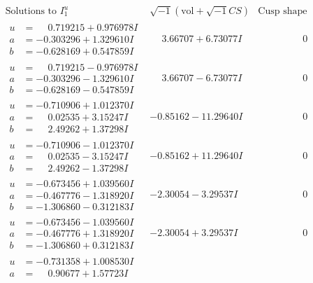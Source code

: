 \documentclass[1p]{elsarticle_modified}
\theoremstyle{definition}
\newcommand{\I}{\sqrt{-1}}
\begin{document}
$$\begin{array}{c|c|c}
\text{Solutions to }I^u_{1}& \I (\text{vol} + \sqrt{-1}CS) & \text{Cusp shape}\\
 \hline 
\begin{aligned}
u &= \phantom{-}0.719215 + 0.976978 I \\
a &= -0.303296 + 1.329610 I \\
b &= -0.628169 + 0.547859 I\end{aligned}
 & \phantom{-}3.66707 + 6.73077 I & \phantom{-0.000000 } 0 \\ \hline\begin{aligned}
u &= \phantom{-}0.719215 - 0.976978 I \\
a &= -0.303296 - 1.329610 I \\
b &= -0.628169 - 0.547859 I\end{aligned}
 & \phantom{-}3.66707 - 6.73077 I & \phantom{-0.000000 } 0 \\ \hline\begin{aligned}
u &= -0.710906 + 1.012370 I \\
a &= \phantom{-}0.02535 + 3.15247 I \\
b &= \phantom{-}2.49262 + 1.37298 I\end{aligned}
 & -0.85162 - 11.29640 I & \phantom{-0.000000 } 0 \\ \hline\begin{aligned}
u &= -0.710906 - 1.012370 I \\
a &= \phantom{-}0.02535 - 3.15247 I \\
b &= \phantom{-}2.49262 - 1.37298 I\end{aligned}
 & -0.85162 + 11.29640 I & \phantom{-0.000000 } 0 \\ \hline\begin{aligned}
u &= -0.673456 + 1.039560 I \\
a &= -0.467776 - 1.318920 I \\
b &= -1.306860 - 0.312183 I\end{aligned}
 & -2.30054 - 3.29537 I & \phantom{-0.000000 } 0 \\ \hline\begin{aligned}
u &= -0.673456 - 1.039560 I \\
a &= -0.467776 + 1.318920 I \\
b &= -1.306860 + 0.312183 I\end{aligned}
 & -2.30054 + 3.29537 I & \phantom{-0.000000 } 0 \\ \hline\begin{aligned}
u &= -0.731358 + 1.008530 I \\
a &= \phantom{-}0.90677 + 1.57723 I \\

\end{aligned}
\end{array}$$
\end{document}
